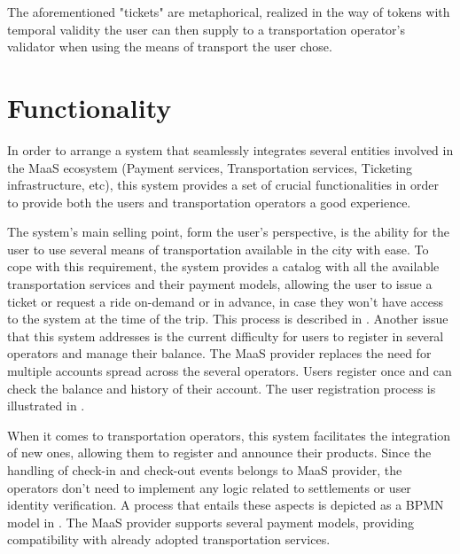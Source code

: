 \documentclass[runningheads,a4]{llncs}
\begin{document}
The aforementioned "tickets" are metaphorical, realized in the way of tokens
with temporal validity the user can then supply to a transportation operator's
validator when using the means of transport the user chose.

\section{Functionality}
\label{sec:functionality}
In order to arrange a system that seamlessly integrates several entities
involved in the \ac{MaaS} ecosystem (Payment services, Transportation services,
Ticketing infrastructure, etc), this system provides a set of crucial
functionalities in order to provide both the users and transportation operators
a good experience.

The system's main selling point, form the user's perspective, is the ability for
the user to use several means of transportation available in the city with ease.
To cope with this requirement, the system provides a catalog with all the
available transportation services and their payment models, allowing the user to
issue a ticket or request a ride on-demand or in advance, in case they won’t
have access to the system at the time of the trip. This process is described in
. Another issue that this system addresses is the current
difficulty for users to register in several operators and manage their balance.
The \ac{MaaS} provider replaces the need for multiple accounts spread across the
several operators. Users register once and can check the balance and history of
their account. The user registration process is illustrated in
.

When it comes to transportation operators, this system facilitates the
integration of new ones, allowing them to register and announce their products.
Since the handling of check-in and check-out events belongs to \ac{MaaS}
provider, the operators don’t need to implement any logic related to settlements
or user identity verification. A process that entails these aspects is depicted
as a \acs{BPMN} model in . The \ac{MaaS} provider supports
several payment models, providing compatibility with already adopted
transportation services.
\end{document}
